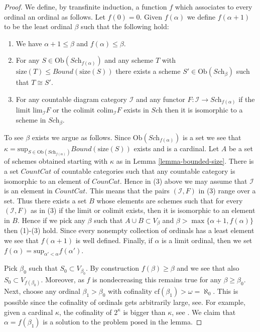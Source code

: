 \begin{proof}
We define, by transfinite induction, a function $f$ which associates
to every ordinal an ordinal as follows. Let $f(0) = 0$.
Given $f(\alpha)$ we define $f(\alpha + 1)$ to be the least
ordinal $\beta$ such that the following hold:
\begin{enumerate}
\item We have $\alpha + 1 \leq \beta$ and $f(\alpha) \leq \beta$.
\item For any $S \in \text{Ob}(\textit{Sch}_{f(\alpha)})$ and any
scheme $T$ with $\text{size}(T) \leq Bound(\text{size}(S))$
there exists a scheme $S' \in \text{Ob}(\textit{Sch}_\beta)$
such that $T \cong S'$.
\item For any countable diagram category $\mathcal{I}$ and
any functor $F : \mathcal{I} \to \textit{Sch}_{f(\alpha)}$ if 
the limit $\text{lim}_\mathcal{I} F$ or the colimit
$\text{colim}_{\mathcal{I}} F$ exists in $\textit{Sch}$
then it is isomorphic to a scheme in $\textit{Sch}_\beta$.
\end{enumerate}
To see $\beta$ exists we argue as follows. Since
$\text{Ob}(\textit{Sch}_{f(\alpha)})$ is a set we see that
$\kappa =
\text{sup}_{S \in \text{Ob}(\textit{Sch}_{f(\alpha)})} Bound(\text{size}(S))$
exists and is a cardinal.
Let $A$ be a set of schemes obtained starting with $\kappa$
as in Lemma \ref{lemma-bounded-size}.
There is a set $CountCat$ of countable
categories such that any countable category is isomorphic to 
an element of $CounCat$. Hence in (3) above we may assume
that $\mathcal{I}$ is an element in $CountCat$. This means that
the pairs $(\mathcal{I}, F)$ in (3) range over a set.
Thus there exists a set $B$ whose elements are schemes 
such that for every $(\mathcal{I}, F)$ as in (3) if the
limit or colimit exists, then it is isomorphic to an element in $B$.
Hence if we pick any $\beta$ such that $A \cup B \subset V_\beta$
and $\beta > \max\{\alpha + 1, f(\alpha)\}$ then (1)-(3) hold.
Since every nonempty collection of ordinals has a least element
we see that $f(\alpha + 1)$ is well defined. Finally, if $\alpha$
is a limit ordinal, then we set
$f(\alpha) = \text{sup}_{\alpha' < \alpha} f(\alpha')$.

\medskip\noindent
Pick $\beta_0$ such that $S_0 \subset V_{\beta_0}$.
By construction $f(\beta) \geq \beta$ and we see that
also $S_0 \subset V_{f(\beta_0)}$. Moreover, as $f$ is
nondecreasing this remains true for any $\beta \geq \beta_0$.
Next, choose any ordinal $\beta_1 > \beta_0$ with cofinality
$\text{cf}(\beta_1) > \omega = \aleph_0$. This is possible
since the cofinality of ordinals gets arbitrarily large,
see. For example, given a cardinal $\kappa$,
the cofinality of $2^\kappa$ is bigger than $\kappa$, see
\cite[Chapter I, Corollary 10.41]{Kunen}. We claim that
$\alpha = f(\beta_1)$ is a solution to the problem posed in the lemma.


\end{proof}
